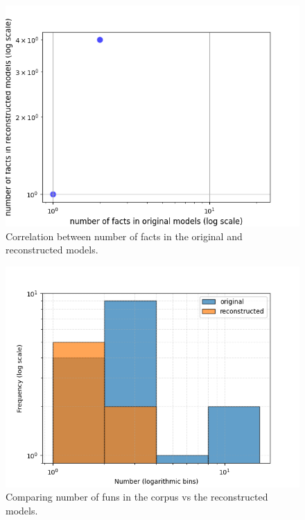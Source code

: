 \documentclass[conference]{IEEEtran}
\begin{document}
    
    \begin{figure}[htbp]
    \centerline{\includegraphics[width=\linewidth]{"./Correlation between number of facts in the original and reconstructed models.png"}}
    \caption{Correlation between number of facts in the original and reconstructed models.}
    \label{fig}
    \end{figure}
    
    
    \begin{figure}[htbp]
    \centerline{\includegraphics[width=\linewidth]{"./Comparing number of funs in the corpus vs the reconstructed models.png"}}
    \caption{Comparing number of funs in the corpus vs the reconstructed models.}
    \label{fig}
    \end{figure}
    
\end{document}

